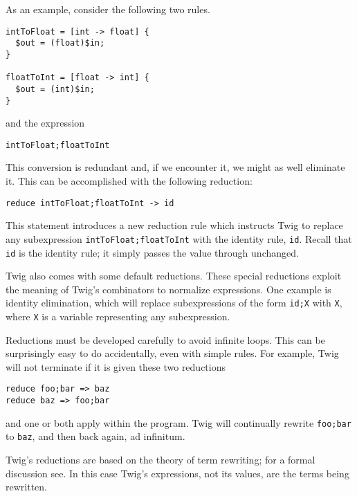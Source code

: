As an example, consider the following two rules.

\begin{verbatim}
intToFloat = [int -> float] {
  $out = (float)$in;
}

floatToInt = [float -> int] {
  $out = (int)$in;
}
\end{verbatim}

and the expression

\begin{verbatim}
intToFloat;floatToInt
\end{verbatim}

This conversion is redundant and, if we encounter it, we might as well eliminate it. This can be accomplished with the following reduction:

\begin{verbatim}
reduce intToFloat;floatToInt -> id
\end{verbatim}

This statement introduces a new reduction rule which instructs Twig to replace any subexpression \texttt{intToFloat;floatToInt} with the identity rule, \texttt{id}. Recall that \texttt{id} is the identity rule; it simply passes the value through unchanged.

Twig also comes with some default reductions. These special reductions exploit the meaning of Twig's combinators to normalize expressions. One example is identity elimination, which will replace subexpressions of the form \texttt{id;X} with \texttt{X}, where \texttt{X} is a variable representing any subexpression.

Reductions must be developed carefully to avoid infinite loops. This can be surprisingly easy to do accidentally, even with simple rules. For example, Twig will not terminate if it is given these two reductions

\begin{verbatim}
reduce foo;bar => baz
reduce baz => foo;bar
\end{verbatim}

and one or both apply within the program. Twig will continually rewrite \texttt{foo;bar} to \texttt{baz}, and then back again, ad infinitum.

Twig's reductions are based on the theory of term rewriting; for a formal discussion see\cite{baader98rewriting}. In this case Twig's expressions, not its values, are the terms being rewritten.

